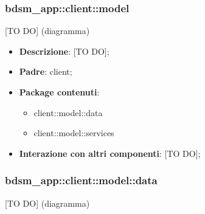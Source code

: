 %
%



\subsubsection{bdsm\_app::client::model} %
\label{ssub:bdsm_app_client_model}
[TO DO] (diagramma) \newline \newline

\begin{itemize}
	\item \textbf{Descrizione}: [TO DO];
	\item \textbf{Padre}: client;
	\item \textbf{Package contenuti}:
		\begin{itemize}
			\item client::model::data
			\item client::model::services
		\end{itemize}
	\item \textbf{Interazione con altri componenti}: [TO DO];
\end{itemize}


\subsubsection{bdsm\_app::client::model::data} %
\label{ssub:bdsm_app_client_model_data}
[TO DO] (diagramma) \newline \newline

